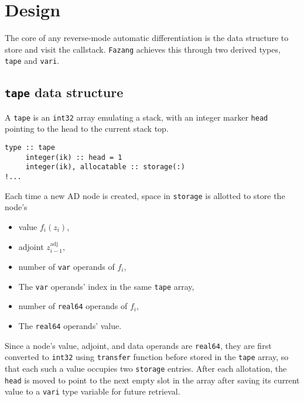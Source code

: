 \documentclass[12pt, reqno, oneside]{amsbook}
\numberwithin{equation}{chapter}
\begin{document}
\chapter{Design}
\label{sec:org56161c2}
The core of any reverse-mode automatic differentiation is the data
structure to store and visit the callstack. \texttt{Fazang} achieves this
through two derived types, \texttt{tape} and \texttt{vari}.

\section{\texttt{tape} data structure}
\label{sec:org79f6067}
A \texttt{tape} is an \texttt{int32} array emulating a stack, with an integer marker \texttt{head} pointing to the
head to the current stack top.
\begin{verbatim}
type :: tape
     integer(ik) :: head = 1
     integer(ik), allocatable :: storage(:)
!...
\end{verbatim}
Each time a new AD node is created,
space in \texttt{storage} is allotted to store the node's
\begin{itemize}
\item value \(f_i(z_i)\),
\item adjoint \(z_{i-1}^{\text{adj}}\),
\item number of \texttt{var} operands of \(f_i\),
\item The \texttt{var} operands' index in the same \texttt{tape} array,
\item number of \texttt{real64} operands of \(f_i\),
\item The \texttt{real64} operands' value.
\end{itemize}

Since a node's value, adjoint, and data
operands are \texttt{real64}, they are first converted to \texttt{int32} using
\texttt{transfer} function before stored in the \texttt{tape} array, so that each such
a value occupies two \texttt{storage} entries. After each
allotation, the \texttt{head} is moved to point to the next empty slot in
the array after saving its current value to a \texttt{vari} type variable
for future retrieval.
\end{document}
